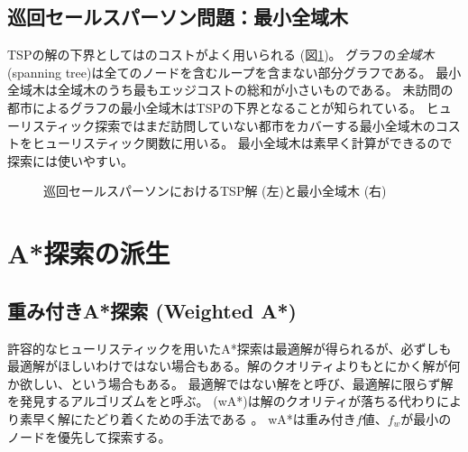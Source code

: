 

\subsection{巡回セールスパーソン問題：最小全域木}
TSPの解の下界としてはのコストがよく用いられる (図\ref{fig:tsp-mst})。
グラフの{\it 全域木} (spanning tree)は全てのノードを含むループを含まない部分グラフである。
最小全域木は全域木のうち最もエッジコストの総和が小さいものである。
未訪問の都市によるグラフの最小全域木はTSPの下界となることが知られている。
ヒューリスティック探索ではまだ訪問していない都市をカバーする最小全域木のコストをヒューリスティック関数に用いる。
最小全域木は素早く計算ができるので探索には使いやすい。

\begin{figure}[tbh]
  \centering
  \begin{tikzpicture}[scale=0.6]
    
  \end{tikzpicture}
\caption{巡回セールスパーソンにおけるTSP解 (左)と最小全域木 (右)}
\label{fig:tsp-mst}
\end{figure}

\section{A*探索の派生}

\subsection{重み付きA*探索 (Weighted A*)}
\label{sec:weighted-astar-search}

許容的なヒューリスティックを用いたA*探索は最適解が得られるが、必ずしも最適解がほしいわけではない場合もある。解のクオリティよりもとにかく解が何か欲しい、という場合もある。
最適解ではない解をと呼び、最適解に限らず解を発見するアルゴリズムをと呼ぶ。%
 (wA*)は解のクオリティが落ちる代わりにより素早く解にたどり着くための手法である \cite{wilt2010comparison}。
wA*は重み付き$f$値、$f_w$が最小のノードを優先して探索する。

